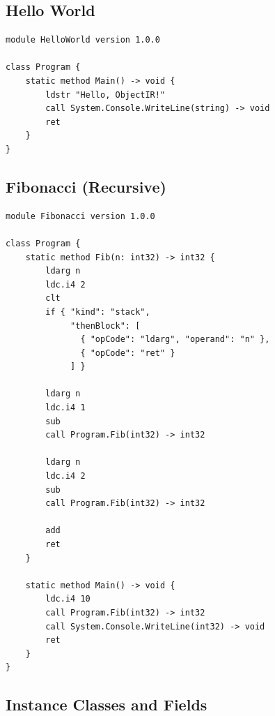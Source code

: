 \documentclass[11pt,a4paper]{article}
\begin{document}
\subsection{Hello World}

\begin{lstlisting}[style=textir, caption={Hello World in TextIR}]
module HelloWorld version 1.0.0

class Program {
    static method Main() -> void {
        ldstr "Hello, ObjectIR!"
        call System.Console.WriteLine(string) -> void
        ret
    }
}
\end{lstlisting}

\subsection{Fibonacci (Recursive)}

\begin{lstlisting}[style=textir, caption={Recursive Fibonacci}]
module Fibonacci version 1.0.0

class Program {
    static method Fib(n: int32) -> int32 {
        ldarg n
        ldc.i4 2
        clt
        if { "kind": "stack",
             "thenBlock": [
               { "opCode": "ldarg", "operand": "n" },
               { "opCode": "ret" }
             ] }

        ldarg n
        ldc.i4 1
        sub
        call Program.Fib(int32) -> int32

        ldarg n
        ldc.i4 2
        sub
        call Program.Fib(int32) -> int32

        add
        ret
    }

    static method Main() -> void {
        ldc.i4 10
        call Program.Fib(int32) -> int32
        call System.Console.WriteLine(int32) -> void
        ret
    }
}
\end{lstlisting}

\subsection{Instance Classes and Fields}
\end{document}
